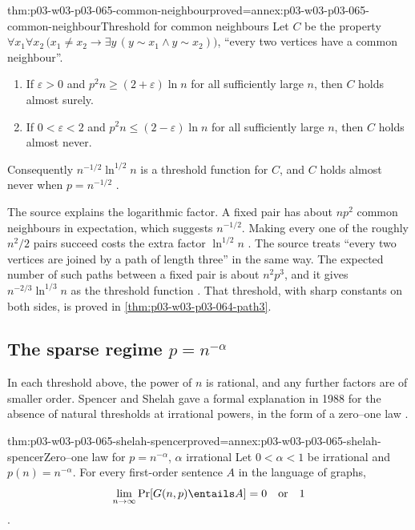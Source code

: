 \begin{hbtheorem}{thm:p03-w03-p03-065-common-neighbour}{proved=annex:p03-w03-p03-065-common-neighbour}{Threshold for common neighbours}
Let \(C\) be the property
\(\forall x_1\forall x_2\,\bigl(x_1\neq x_2\rightarrow\exists y\,(y\sim x_1\wedge
y\sim x_2)\bigr)\), ``every two vertices have a common neighbour''.
\begin{enumerate}
\item If \(\varepsilon>0\) and \(p^2n\geq(2+\varepsilon)\ln n\) for all
sufficiently large \(n\), then \(C\) holds almost surely.
\item If \(0<\varepsilon<2\) and \(p^2n\leq(2-\varepsilon)\ln n\) for all
sufficiently large \(n\), then \(C\) holds almost never.
\end{enumerate}
Consequently \(n^{-1/2}\ln^{1/2}n\) is a threshold function for \(C\), and
\(C\) holds almost never when \(p=n^{-1/2}\)
\cite[p.~5]{Spencer2007LogicRandomStructuresAuthor}.
\end{hbtheorem}

The source explains the logarithmic factor.  A fixed pair has about \(np^2\)
common neighbours in expectation, which suggests \(n^{-1/2}\).  Making every
one of the roughly \(n^2/2\) pairs succeed costs the extra factor
\(\ln^{1/2}n\) \cite[p.~5]{Spencer2007LogicRandomStructuresAuthor}.  The source treats
``every two vertices are joined by a path of length three'' in the same way.
The expected number of such paths between a fixed pair is about \(n^2p^3\),
and it gives \(n^{-2/3}\ln^{1/3}n\) as the threshold function
\cite[p.~5]{Spencer2007LogicRandomStructuresAuthor}.  That threshold, with
sharp constants on both sides, is proved in
\cref{thm:p03-w03-p03-064-path3}.

\subsection{The sparse regime \(p=n^{-\alpha}\)}
\label{sec:p03-w03-p03-065-sparse-regime}

In each threshold above, the power of \(n\) is rational, and any further
factors are of smaller order.  Spencer and Shelah gave a formal explanation in
1988 for the absence of natural thresholds at irrational powers, in the form
of a zero--one law \cite[p.~5]{Spencer2007LogicRandomStructuresAuthor}.

\begin{hbtheorem}{thm:p03-w03-p03-065-shelah-spencer}{proved=annex:p03-w03-p03-065-shelah-spencer}{Zero--one law for \(p=n^{-\alpha}\), \(\alpha\) irrational}
Let \(0<\alpha<1\) be irrational and \(p(n)=n^{-\alpha}\).  For every
first-order sentence \(A\) in the language of graphs,
\[
  \lim_{n\to\infty}\Pr[G(n,p)\entails A]=0\quad\text{or}\quad 1
\]
\cite[pp.~5--6]{Spencer2007LogicRandomStructuresAuthor}.
\end{hbtheorem}

